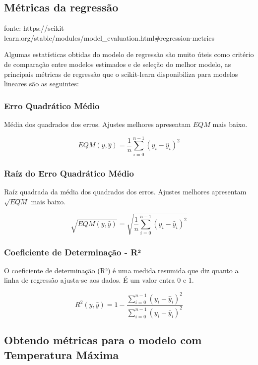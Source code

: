 \documentclass[11pt]{article}
\begin{document}
    \hypertarget{muxe9tricas-da-regressuxe3o}{%
\subsection{Métricas da regressão}\label{muxe9tricas-da-regressuxe3o}}

fonte:
https://scikit-learn.org/stable/modules/model\_evaluation.html\#regression-metrics

Algumas estatísticas obtidas do modelo de regressão são muito úteis como
critério de comparação entre modelos estimados e de seleção do melhor
modelo, as principais métricas de regressão que o scikit-learn
disponibiliza para modelos lineares são as seguintes:

\hypertarget{erro-quadruxe1tico-muxe9dio}{%
\subsubsection{Erro Quadrático
Médio}\label{erro-quadruxe1tico-muxe9dio}}

Média dos quadrados dos erros. Ajustes melhores apresentam \(EQM\) mais
baixo.

\[EQM(y, \hat{y}) = \frac 1n\sum_{i=0}^{n-1}(y_i-\hat{y}_i)^2\]

\hypertarget{rauxedz-do-erro-quadruxe1tico-muxe9dio}{%
\subsubsection{Raíz do Erro Quadrático
Médio}\label{rauxedz-do-erro-quadruxe1tico-muxe9dio}}

Raíz quadrada da média dos quadrados dos erros. Ajustes melhores
apresentam \(\sqrt{EQM}\) mais baixo.

\[\sqrt{EQM(y, \hat{y})} = \sqrt{\frac 1n\sum_{i=0}^{n-1}(y_i-\hat{y}_i)^2}\]

\hypertarget{coeficiente-de-determinauxe7uxe3o---r}{%
\subsubsection{Coeficiente de Determinação -
R²}\label{coeficiente-de-determinauxe7uxe3o---r}}

O coeficiente de determinação (R²) é uma medida resumida que diz quanto
a linha de regressão ajusta-se aos dados. É um valor entra 0 e 1.

\[R^2(y, \hat{y}) = 1 - \frac {\sum_{i=0}^{n-1}(y_i-\hat{y}_i)^2}{\sum_{i=0}^{n-1}(y_i-\bar{y}_i)^2}\]

    \hypertarget{obtendo-muxe9tricas-para-o-modelo-com-temperatura-muxe1xima}{%
\subsection{Obtendo métricas para o modelo com Temperatura
Máxima}\label{obtendo-muxe9tricas-para-o-modelo-com-temperatura-muxe1xima}}
\end{document}
